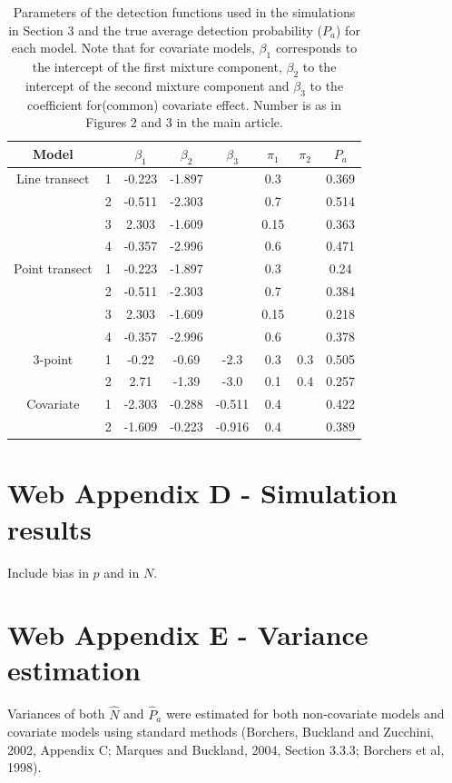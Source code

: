 \documentclass[useAMS,referee]{biom}
\begin{document}
\begin{table}[htbp]
\centering
\caption{Parameters of the detection functions used in the simulations in Section 3 and the true average detection probability ($P_a$) for each model. Note that for covariate models, $\beta_1$ corresponds to the intercept of the first mixture component, $\beta_2$ to the intercept of the second mixture component and $\beta_3$ to the coefficient for(common) covariate effect. Number is as in Figures 2 and 3 in the main article.}
\begin{tabular}{c c c c c c c c}\\
\hline
\hline
Model & & $\beta_1$ & $\beta_2$ & $\beta_3$ & $\pi_1$ & $\pi_2$ & $P_a$ \\
\hline
\hline
Line transect &1 & -0.223 & -1.897 & &  0.3 & &  0.369\\
 &2 & -0.511 & -2.303 & &  0.7 & &  0.514\\
 &3 &  2.303 & -1.609 & & 0.15 & &  0.363\\
 &4 & -0.357 & -2.996 & &  0.6 & &  0.471\\
Point transect &1 & -0.223 & -1.897 & &  0.3 & &  0.24\\
 &2 & -0.511 & -2.303 & &  0.7 & &  0.384\\
 &3 &  2.303 & -1.609 & & 0.15 & &  0.218\\
 &4 & -0.357 & -2.996 & &  0.6 & &  0.378\\
3-point & 1 &  -0.22 &  -0.69 &  -2.3 & 0.3 & 0.3 & 0.505\\
 & 2 &   2.71 &  -1.39 &  -3.0 & 0.1 & 0.4 & 0.257\\
Covariate & 1 & -2.303 & -0.288 & -0.511 & 0.4 & & 0.422\\
 & 2 & -1.609 & -0.223 & -0.916 & 0.4 & & 0.389\\
\hline
\end{tabular}
\label{partable}
\bigskip
\end{table}

\section*{Web Appendix D - Simulation results}

Include bias in $p$ and in $N$.


\section*{Web Appendix E - Variance estimation}

Variances of both $\hat{N}$ and $\hat{P}_a$ were estimated for both non-covariate models and covariate models using standard methods (Borchers, Buckland and Zucchini, 2002, Appendix C; Marques and Buckland, 2004, Section 3.3.3; Borchers et al, 1998).
\end{document}
